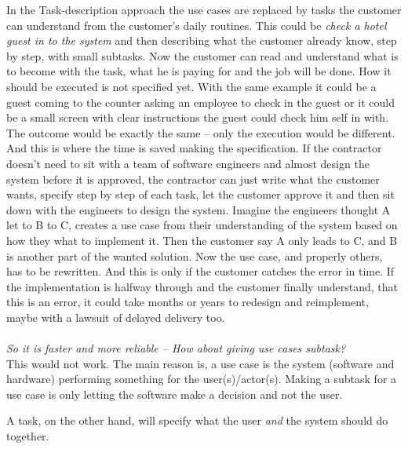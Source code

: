 \documentclass[Main]{subfiles}
\begin{document}
In the Task-description approach the use cases are replaced by tasks the customer can understand from the customer's daily routines.
This could be \textit{check a hotel guest in to the system} and then describing what the customer already know, step by step, with small subtasks.
Now the customer can read and understand what is to become with the task, what he is paying for and the job will be done.
How it should be executed is not specified yet.
With the same example it could be a guest coming to the counter asking an employee to check in the guest or it could be a small screen with clear instructions the guest could check him self in with.
The outcome would be exactly the same -- only the execution would be different.
And this is where the time is saved making the specification.
If the contractor doesn't need to sit with a team of software engineers and almost design the system before it is approved, the contractor can just write what the customer wants, specify step by step of each task, let the customer approve it and then sit down with the engineers to design the system.
Imagine the engineers thought A let to B to C, creates a use case from their understanding of the system based on how they what to implement it. 
Then the customer say A only leads to C, and B is another part of the wanted solution. 
Now the use case, and properly others, has to be rewritten.
And this is only if the customer catches the error in time. 
If the implementation is halfway through and the customer finally understand, that this is an error, it could take months or years to redesign and reimplement, maybe with a lawsuit of delayed delivery too.
\\
\\
\textit{So it is faster and more reliable -- How about giving use cases subtask?}
\\
This would not work.
The main reason is, a use case is the system (software and hardware) performing something for the user(s)/actor(s).
Making a subtask for a use case is only letting the software make a decision and not the user.

A task, on the other hand, will specify what the user \textit{and} the system should do together.
\end{document}
